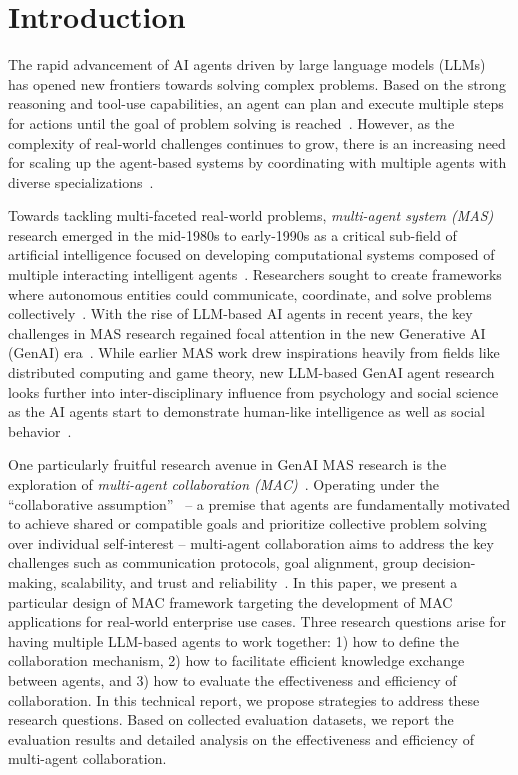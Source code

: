 \section{Introduction}
\label{sec:intro}

The rapid advancement of AI agents driven by large language models (LLMs)~\cite{gpt3} has opened new frontiers towards solving complex problems. Based on the strong reasoning and tool-use capabilities, an agent can plan and execute multiple steps for actions until the goal of problem solving is reached~\cite{yao2023react}. However, as the complexity of real-world challenges continues to grow, there is an increasing need for scaling up the agent-based systems by coordinating with multiple agents with diverse specializations~\cite{chatdev}.

Towards tackling multi-faceted real-world problems, \emph{multi-agent system (MAS)} research emerged in the mid-1980s to early-1990s as a critical sub-field of artificial intelligence focused on developing computational systems composed of multiple interacting intelligent agents~\cite{singh1994multiagent}. Researchers sought to create frameworks where autonomous entities could communicate, coordinate, and solve problems collectively~\cite{sycara1998multiagent}. With the rise of LLM-based AI agents in recent years, the key challenges in MAS research
regained focal attention in the new Generative AI (GenAI) era~\cite{han2024llm}. While earlier MAS work drew inspirations heavily from fields like distributed computing and game theory, new LLM-based GenAI agent research looks further into inter-disciplinary influence from psychology and social science as the AI agents start to demonstrate human-like intelligence as well as social behavior~\cite{Park2023GenerativeAgents}. 

One particularly fruitful research avenue in GenAI MAS research is the exploration of \emph{multi-agent collaboration (MAC)}~\cite{hong2024metagpt}. Operating under the ``collaborative assumption''~\cite{li-etal-2023-theory} -- a premise that agents are fundamentally motivated to achieve shared or compatible goals and prioritize collective problem solving over individual self-interest -- multi-agent collaboration aims to address the key challenges such as communication protocols, goal alignment, group decision-making, scalability, and trust and reliability~\cite{chen2023agentverse,talebirad2023multi,zhang2024towards}. 
In this paper, we present a particular design of MAC framework targeting the development of MAC applications for real-world enterprise use cases. Three research questions arise for having multiple LLM-based agents to work together: 1) how to define the collaboration mechanism, 2) how to facilitate efficient knowledge exchange between agents, and 3) how to evaluate the effectiveness and efficiency of collaboration. In this technical report, we propose strategies to address these research questions. Based on collected evaluation datasets, we report the evaluation results and detailed analysis on the effectiveness and efficiency of multi-agent collaboration.

